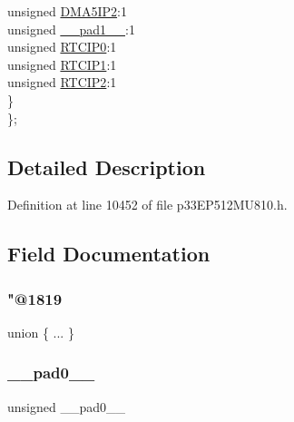 \begin{DoxyCompactItemize}
\begin{tabbing}
\>\>unsigned \hyperlink{structtag_i_p_c15_b_i_t_s_a16fdd8eaeebf6786a00ade30c489fdd0}{DMA5IP2}:1\\
\>\>unsigned \hyperlink{structtag_i_p_c15_b_i_t_s_acaf2d0924a107ec6e8d2e31febaf66f9}{\_\_pad1\_\_}:1\\
\>\>unsigned \hyperlink{structtag_i_p_c15_b_i_t_s_ac4d2248cf2a696e014ae86ae675a459f}{RTCIP0}:1\\
\>\>unsigned \hyperlink{structtag_i_p_c15_b_i_t_s_a39518505f4603cd8b09f5ab1f65357b8}{RTCIP1}:1\\
\>\>unsigned \hyperlink{structtag_i_p_c15_b_i_t_s_a610730a802c8959ce1488f5921e2f2e1}{RTCIP2}:1\\
\>\} \\
\}; \\

\end{tabbing}\end{DoxyCompactItemize}


\subsection{Detailed Description}


Definition at line 10452 of file p33\+E\+P512\+M\+U810.\+h.



\subsection{Field Documentation}
\mbox{\label{structtag_i_p_c15_b_i_t_s_a621911fd50b62bd85c7c60568738a4cc}} 
\subsubsection{\texorpdfstring{"@1819}{@1819}}
{\footnotesize\ttfamily union \{ ... \} }

\mbox{\label{structtag_i_p_c15_b_i_t_s_adf71f3d8410c1f1dbbc96680a92c49af}} 
\subsubsection{\texorpdfstring{\+\_\+\+\_\+pad0\+\_\+\+\_\+}{\_\_pad0\_\_}}
{\footnotesize\ttfamily unsigned \+\_\+\+\_\+pad0\+\_\+\+\_\+}




